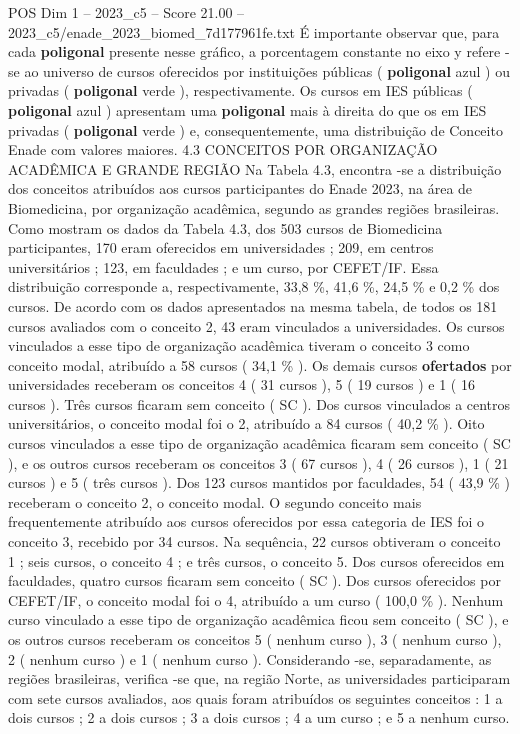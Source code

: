 \begin{textsample}{POS Dim 1 – 2023\_c5 – Score 21.00 – 2023\_c5/enade\_2023\_biomed\_7d177961fe.txt}
É importante observar que, para cada \textbf{poligonal} presente nesse gráfico, a porcentagem constante no eixo y refere -se ao universo de cursos oferecidos por instituições públicas ( \textbf{poligonal} azul ) ou privadas ( \textbf{poligonal} verde ), respectivamente.
Os cursos em IES públicas ( \textbf{poligonal} azul ) apresentam uma \textbf{poligonal} mais à direita do que os em IES privadas ( \textbf{poligonal} verde ) e, consequentemente, uma distribuição de Conceito Enade com valores maiores. 4.3 CONCEITOS POR ORGANIZAÇÃO ACADÊMICA E GRANDE REGIÃO Na Tabela 4.3, encontra -se a distribuição dos conceitos atribuídos aos cursos participantes do Enade 2023, na área de Biomedicina, por organização acadêmica, segundo as grandes regiões brasileiras.
Como mostram os dados da Tabela 4.3, dos 503 cursos de Biomedicina participantes, 170 eram oferecidos em universidades ; 209, em centros universitários ; 123, em faculdades ; e um curso, por CEFET/IF.
Essa distribuição corresponde a, respectivamente, 33,8 \%, 41,6 \%, 24,5 \% e 0,2 \% dos cursos.
De acordo com os dados apresentados na mesma tabela, de todos os 181 cursos avaliados com o conceito 2, 43 eram vinculados a universidades.
Os cursos vinculados a esse tipo de organização acadêmica tiveram o conceito 3 como conceito modal, atribuído a 58 cursos ( 34,1 \% ).
Os demais cursos \textbf{ofertados} por universidades receberam os conceitos 4 ( 31 cursos ), 5 ( 19 cursos ) e 1 ( 16 cursos ).
Três cursos ficaram sem conceito ( SC ).
Dos cursos vinculados a centros universitários, o conceito modal foi o 2, atribuído a 84 cursos ( 40,2 \% ).
Oito cursos vinculados a esse tipo de organização acadêmica ficaram sem conceito ( SC ), e os outros cursos receberam os conceitos 3 ( 67 cursos ), 4 ( 26 cursos ), 1 ( 21 cursos ) e 5 ( três cursos ).
Dos 123 cursos mantidos por faculdades, 54 ( 43,9 \% ) receberam o conceito 2, o conceito modal.
O segundo conceito mais frequentemente atribuído aos cursos oferecidos por essa categoria de IES foi o conceito 3, recebido por 34 cursos.
Na sequência, 22 cursos obtiveram o conceito 1 ; seis cursos, o conceito 4 ; e três cursos, o conceito 5.
Dos cursos oferecidos em faculdades, quatro cursos ficaram sem conceito ( SC ).
Dos cursos oferecidos por CEFET/IF, o conceito modal foi o 4, atribuído a um curso ( 100,0 \% ).
Nenhum curso vinculado a esse tipo de organização acadêmica ficou sem conceito ( SC ), e os outros cursos receberam os conceitos 5 ( nenhum curso ), 3 ( nenhum curso ), 2 ( nenhum curso ) e 1 ( nenhum curso ).
Considerando -se, separadamente, as regiões brasileiras, verifica -se que, na região Norte, as universidades participaram com sete cursos avaliados, aos quais foram atribuídos os seguintes conceitos : 1 a dois cursos ; 2 a dois cursos ; 3 a dois cursos ; 4 a um curso ; e 5 a nenhum curso.

\end{textsample}
